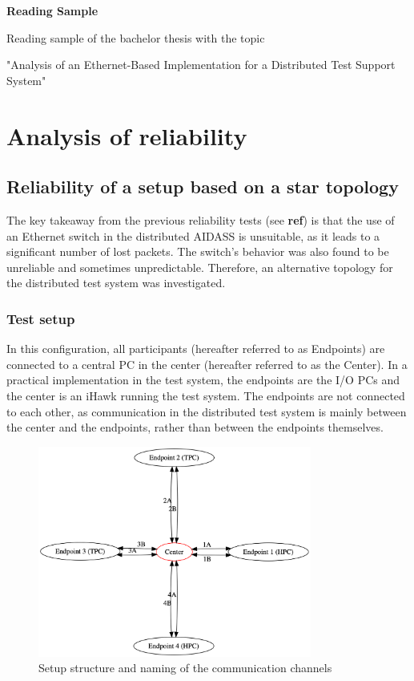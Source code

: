 \documentclass[11pt]{article}
\begin{document}

\begin{center}	
		\vspace{1cm}
		
		\huge\textbf{Reading Sample}\\[2.5em]
		\normalsize
		
		Reading sample of the bachelor thesis with the topic
		
		"Analysis of an Ethernet-Based Implementation for a Distributed Test Support System"
\end{center}
\cleardoublepage


\tableofcontents
\cleardoublepage


\section{Analysis of reliability} \label{Analysis of reliability}
\subsection{Reliability of a setup based on a star topology}
The key takeaway from the previous reliability tests (see \textbf{ref}) is that the use of an Ethernet switch in the distributed AIDASS is unsuitable, as it leads to a significant number of lost packets. The switch's behavior was also found to be unreliable and sometimes unpredictable. Therefore, an alternative topology for the distributed test system was investigated.

\subsubsection{Test setup}
In this configuration, all participants (hereafter referred to as Endpoints) are connected to a central PC in the center (hereafter referred to as the Center). In a practical implementation in the test system, the endpoints are the I/O PCs and the center is an iHawk running the test system. The endpoints are not connected to each other, as communication in the distributed test system is mainly between the center and the endpoints, rather than between the endpoints themselves.

\begin{figure}[h]
	\includegraphics[width=9cm]{fig1.png}
	\centering
	\caption{Setup structure and naming of the communication channels}
    \label{fig:fig1}
\end{figure}
\end{document}
